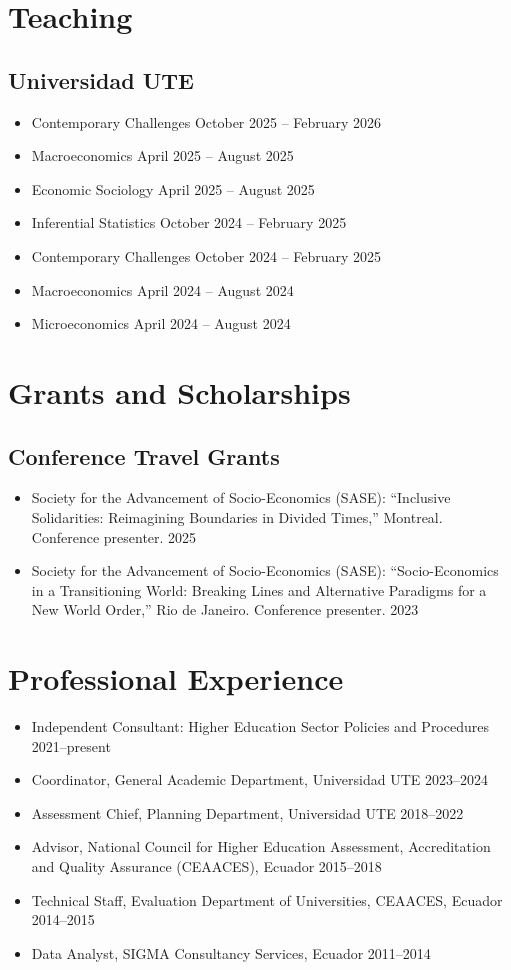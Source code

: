 ﻿\documentclass[11pt]{article}
\begin{document}
\section*{Teaching}\subsection*{Universidad UTE}
\begin{itemize}
\item Contemporary Challenges \hfill October 2025 -- February 2026
\item Macroeconomics \hfill April 2025 -- August 2025
\item Economic Sociology \hfill April 2025 -- August 2025
\item Inferential Statistics \hfill October 2024 -- February 2025
\item Contemporary Challenges \hfill October 2024 -- February 2025
\item Macroeconomics \hfill April 2024 -- August 2024
\item Microeconomics \hfill April 2024 -- August 2024
\end{itemize}

\section*{Grants and Scholarships}
\subsection*{Conference Travel Grants}
\begin{itemize}
\item Society for the Advancement of Socio-Economics (SASE): ``Inclusive Solidarities: Reimagining Boundaries in Divided Times,'' Montreal. Conference presenter. \hfill 2025
\item Society for the Advancement of Socio-Economics (SASE): ``Socio-Economics in a Transitioning World: Breaking Lines and Alternative Paradigms for a New World Order,'' Rio de Janeiro. Conference presenter. \hfill 2023
\end{itemize}

\section*{Professional Experience}
\begin{itemize}
\item Independent Consultant: Higher Education Sector Policies and Procedures \hfill 2021--present
\item Coordinator, General Academic Department, Universidad UTE \hfill 2023--2024
\item Assessment Chief, Planning Department, Universidad UTE \hfill 2018--2022
\item Advisor, National Council for Higher Education Assessment, Accreditation and Quality Assurance (CEAACES), Ecuador \hfill 2015--2018
\item Technical Staff, Evaluation Department of Universities, CEAACES, Ecuador \hfill 2014--2015
\item Data Analyst, SIGMA Consultancy Services, Ecuador \hfill 2011--2014
\end{itemize}
\end{document}
